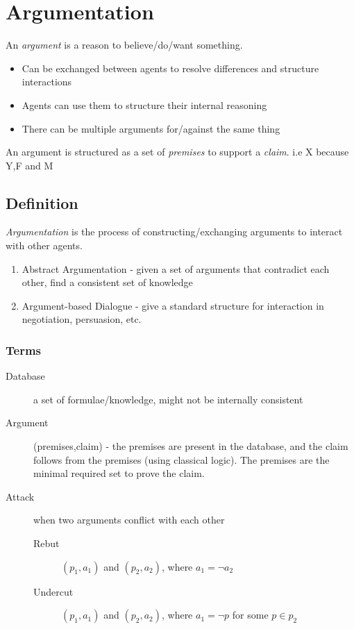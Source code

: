 \section{Argumentation}
An \emph{argument} is a reason to believe/do/want something.
\begin{itemize}
    \item Can be exchanged between agents to resolve differences and structure interactions
    \item Agents can use them to structure their internal reasoning
    \item There can be multiple arguments for/against the same thing
\end{itemize}

An argument is structured as a set of \emph{premises} to support a \emph{claim}. i.e X because Y,F and M

\subsection{Definition}
\emph{Argumentation} is the process of constructing/exchanging arguments to interact with other agents.
\begin{enumerate}
    \item Abstract Argumentation - given a set of arguments that contradict each other, find a consistent set of knowledge
    \item Argument-based Dialogue - give a standard structure for interaction in negotiation, persuasion, etc.
\end{enumerate}

\subsubsection{Terms}
\begin{description}
    \item[Database] a set of formulae/knowledge, might not be internally consistent
    \item[Argument] (premises,claim) - the premises are present in the database, and the claim follows from the premises (using classical logic). The premises are the minimal required set to prove the claim.
    \item[Attack] when two arguments conflict with each other
    \begin{description}
        \item[Rebut] $(p_1,a_1)$ and $(p_2,a_2)$, where $a_1 = \neg a_2$ 
        \item[Undercut] $(p_1,a_1)$ and $(p_2,a_2)$, where $a_1 = \neg p$ for some $p\in p_2$ 
    \end{description}
\end{description}

